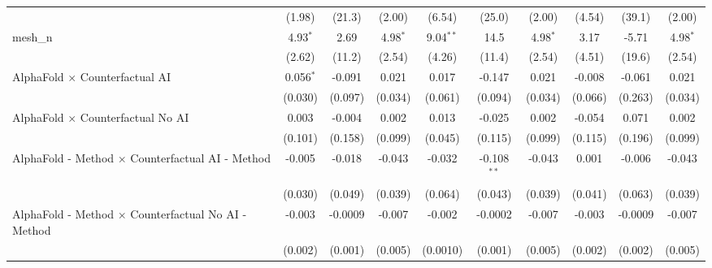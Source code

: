 \begin{tabular}{lccccccccc}
                                                               & (1.98)        & (21.3)        & (2.00)        & (6.54)        & (25.0)        & (2.00)        & (4.54)        & (39.1)        & (2.00)\\   
   mesh\_n                                                     & 4.93$^{*}$    & 2.69          & 4.98$^{*}$    & 9.04$^{**}$   & 14.5          & 4.98$^{*}$    & 3.17          & -5.71         & 4.98$^{*}$\\   
                                                               & (2.62)        & (11.2)        & (2.54)        & (4.26)        & (11.4)        & (2.54)        & (4.51)        & (19.6)        & (2.54)\\   
   AlphaFold $\times$ Counterfactual AI                        & 0.056$^{*}$   & -0.091        & 0.021         & 0.017         & -0.147        & 0.021         & -0.008        & -0.061        & 0.021\\   
                                                               & (0.030)       & (0.097)       & (0.034)       & (0.061)       & (0.094)       & (0.034)       & (0.066)       & (0.263)       & (0.034)\\   
   AlphaFold $\times$ Counterfactual No AI                     & 0.003         & -0.004        & 0.002         & 0.013         & -0.025        & 0.002         & -0.054        & 0.071         & 0.002\\   
                                                               & (0.101)       & (0.158)       & (0.099)       & (0.045)       & (0.115)       & (0.099)       & (0.115)       & (0.196)       & (0.099)\\   
   AlphaFold - Method $\times$ Counterfactual AI - Method      & -0.005        & -0.018        & -0.043        & -0.032        & -0.108$^{**}$ & -0.043        & 0.001         & -0.006        & -0.043\\   
                                                               & (0.030)       & (0.049)       & (0.039)       & (0.064)       & (0.043)       & (0.039)       & (0.041)       & (0.063)       & (0.039)\\   
   AlphaFold - Method $\times$ Counterfactual No AI - Method   & -0.003        & -0.0009       & -0.007        & -0.002        & -0.0002       & -0.007        & -0.003        & -0.0009       & -0.007\\   
                                                               & (0.002)       & (0.001)       & (0.005)       & (0.0010)      & (0.001)       & (0.005)       & (0.002)       & (0.002)       & (0.005)\\   

\end{tabular}
